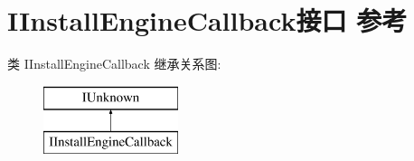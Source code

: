 \hypertarget{interface_i_install_engine_callback}{}\section{I\+Install\+Engine\+Callback接口 参考}
\label{interface_i_install_engine_callback}
类 I\+Install\+Engine\+Callback 继承关系图\+:\begin{figure}[H]
\begin{center}
\leavevmode
\includegraphics[height=2.000000cm]{interface_i_install_engine_callback}
\end{center}
\end{figure}
